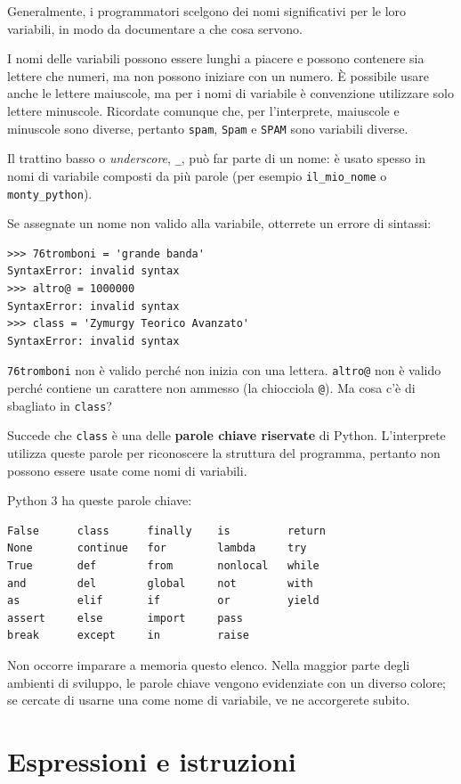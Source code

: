 \documentclass[10pt]{book}
\begin{document}
Generalmente, i programmatori scelgono dei nomi significativi per le loro variabili, in modo da documentare a che cosa servono.

I nomi delle variabili possono essere lunghi a piacere e possono contenere sia lettere che numeri, ma non possono iniziare con un numero. È possibile usare anche le lettere maiuscole, ma per i nomi di variabile è convenzione utilizzare solo lettere minuscole. Ricordate comunque che, per l'interprete, maiuscole e minuscole sono diverse, pertanto \verb"spam", \verb"Spam" e \verb"SPAM" sono variabili diverse.

Il trattino basso o {\em underscore}, \verb"_", può far parte di un nome: è usato spesso in nomi di variabile composti da più parole (per esempio 
\verb"il_mio_nome" o \verb"monty_python").

Se assegnate un nome non valido alla variabile, otterrete un errore di sintassi:

\begin{verbatim}
>>> 76tromboni = 'grande banda'
SyntaxError: invalid syntax
>>> altro@ = 1000000
SyntaxError: invalid syntax
>>> class = 'Zymurgy Teorico Avanzato'
SyntaxError: invalid syntax
\end{verbatim}
%
{\tt 76tromboni} non è valido perché non inizia con una lettera.
{\tt altro@} non è valido perché contiene un carattere non ammesso (la chiocciola {\tt @}). Ma cosa c'è di sbagliato in {\tt class}?

Succede che {\tt class} è una delle {\bf parole chiave riservate} di Python. L'interprete utilizza queste parole per riconoscere la struttura del programma, pertanto non possono essere usate come nomi di variabili.

Python 3 ha queste parole chiave:

\begin{verbatim}
False      class      finally    is         return
None       continue   for        lambda     try
True       def        from       nonlocal   while
and        del        global     not        with
as         elif       if         or         yield
assert     else       import     pass
break      except     in         raise
\end{verbatim}
%
Non occorre imparare a memoria questo elenco. Nella maggior parte degli ambienti di sviluppo, le parole chiave vengono evidenziate con un diverso colore; se cercate di usarne una come nome di variabile, ve ne accorgerete subito.


\section{Espressioni e istruzioni}
\end{document}

